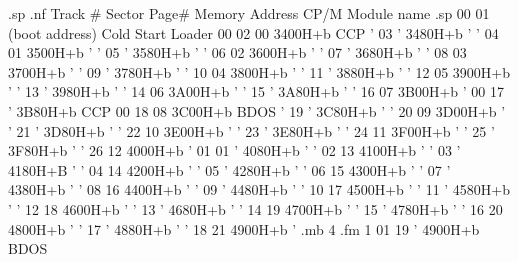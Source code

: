 .sp
.nf
Track #    Sector   Page#   Memory Address    CP/M Module name
.sp
  00         01             (boot address)    Cold Start Loader
  00         02      00        3400H+b               CCP
  '          03      '         3480H+b                '
  '          04      01        3500H+b                '
  '          05      '         3580H+b                '
  '          06      02        3600H+b                '
  '          07      '         3680H+b                '
  '          08      03        3700H+b                '
  '          09      '         3780H+b                '
  '          10      04        3800H+b                '
  '          11      '         3880H+b                '
  '          12      05        3900H+b                '
  '          13      '         3980H+b                '
  '          14      06        3A00H+b                '
  '          15      '         3A80H+b                '
  '          16      07        3B00H+b                '
  00         17      '         3B80H+b               CCP
  00         18      08        3C00H+b              BDOS
  '          19      '         3C80H+b                '
  '          20      09        3D00H+b                '
  '          21      '         3D80H+b                '
  '          22      10        3E00H+b                '
  '          23      '         3E80H+b                '
  '          24      11        3F00H+b                '
  '          25      '         3F80H+b                '
  '          26      12        4000H+b                '
  01         01      '         4080H+b                '
  '          02      13        4100H+b                '
  '          03      '         4180H+B                '
  '          04      14        4200H+b                '
  '          05      '         4280H+b                '
  '          06      15        4300H+b                '
  '          07      '         4380H+b                '
  '          08      16        4400H+b                '
  '          09      '         4480H+b                '
  '          10      17        4500H+b                '
  '          11      '         4580H+b                '
  '          12      18        4600H+b                '
  '          13      '         4680H+b                '
  '          14      19        4700H+b                '
  '          15      '         4780H+b                '
  '          16      20        4800H+b                '
  '          17      '         4880H+b                '
  '          18      21        4900H+b                '
.mb 4
.fm 1
  01         19      '         4900H+b              BDOS
